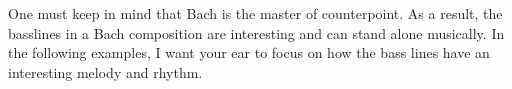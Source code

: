 One must keep in mind that Bach is the master of counterpoint. As a result, the basslines in a Bach composition are interesting and can stand alone musically. In the following examples, I want your ear to focus on how the bass lines have an interesting melody and rhythm. 


